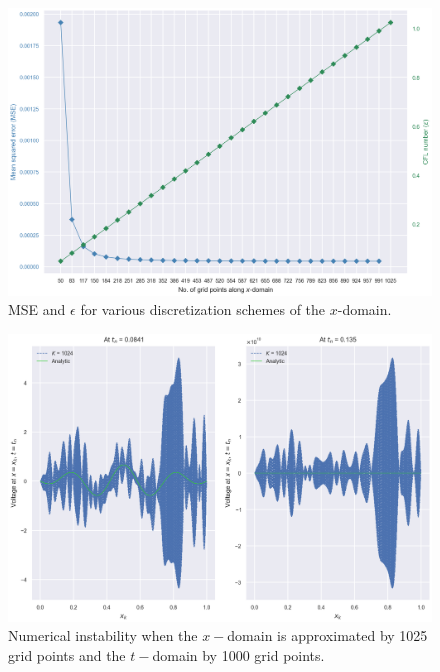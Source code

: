 \documentclass{article}
\begin{document}
\begin{figure}[t!]
   \centering
   \includegraphics[scale=0.7]{on spatial domain discretization - mse and cfl.png}
   \caption{MSE and $\epsilon$ for various discretization schemes of the $x$-domain.}
	\label{fig: On Spatial Domain Discretization results: MSE and CFL}
\end{figure}

\begin{figure}[t!]
   \centering
   \includegraphics[scale=0.7]{on spatial domain discretization - finite time blowup.png}
   \caption{Numerical instability when the $x-$domain is approximated by 1025 grid points and the $t-$domain by 1000 grid points.}
	\label{fig: On Spatial Domain Discretization results: Finite time blowup}
\end{figure}
\end{document}
